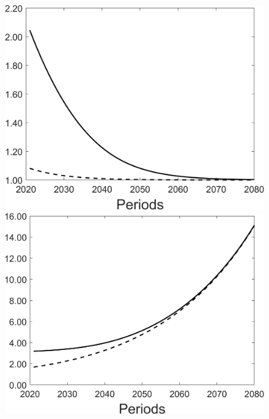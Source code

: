 \begin{figure}[h!!]
\begin{minipage}[]{0.32\textwidth}
	\end{minipage}
\begin{minipage}[]{0.32\textwidth}
\includegraphics[width=1\textwidth]{../../codding_model/Own/figures/Rep_agent/staticBAU_LF_separate_pd_periods59_eppsilon4.00_zeta1.40_Ad08_Ac04_thetac0.70_thetad0.56_HetGrowth1_tauul0.181_util0_withtarget0_lgd0.png}
\end{minipage}
\begin{minipage}[]{0.32\textwidth}
\includegraphics[width=1\textwidth]{../../codding_model/Own/figures/Rep_agent/staticBAU_LF_separate_pc_periods59_eppsilon4.00_zeta1.40_Ad08_Ac04_thetac0.70_thetad0.56_HetGrowth1_tauul0.181_util0_withtarget0_lgd0.png}

\end{minipage}
\end{figure}

